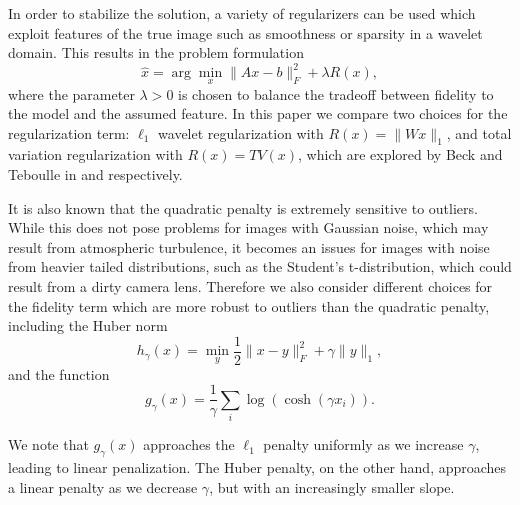 \documentclass[10pt,a4paper]{article}
\begin{document}
In order to stabilize the solution, a variety of regularizers can be used which exploit features of the true image such as smoothness or sparsity in a wavelet domain. This results in the problem formulation
\begin{equation}
\hat{x} = \arg\min_{x} \| Ax - b \|_F^2 + \lambda R(x),
\end{equation}
where the parameter $\lambda > 0$ is chosen to balance the tradeoff between fidelity to the model and the assumed feature. In this paper we compare two choices for the regularization term: $\ell_1$ wavelet regularization with $R(x) = \| Wx \|_1$, and total variation regularization with $R(x) = TV(x)$, which are explored by Beck and Teboulle in \cite{TV} and \cite{FISTA} respectively.



It is also known that the quadratic penalty is extremely sensitive to outliers. While this does not pose problems for images with Gaussian noise, which may result from atmospheric turbulence, it becomes an issues for images with noise from heavier tailed distributions, such as the Student's t-distribution, which could result from a dirty camera lens. Therefore we also consider different choices for the fidelity term which are more robust to outliers than the quadratic penalty, including the Huber norm
\begin{equation} \label{huber}
h_{\gamma}(x) = \min_y \frac{1}{2} \| x - y \|_F^2 + \gamma \| y \|_1,
\end{equation}
and the function
\begin{equation} \label{log_cosh}
g_{\gamma}(x) = \frac{1}{\gamma} \sum_i \log\left(\cosh\left(\gamma x_i\right)\right).
\end{equation}

We note that $g_{\gamma}(x)$ approaches the $\ell_1$ penalty uniformly as we increase $\gamma$, leading to linear penalization. The Huber penalty, on the other hand, approaches a linear penalty as we decrease $\gamma$, but with an increasingly smaller slope.
\end{document}
